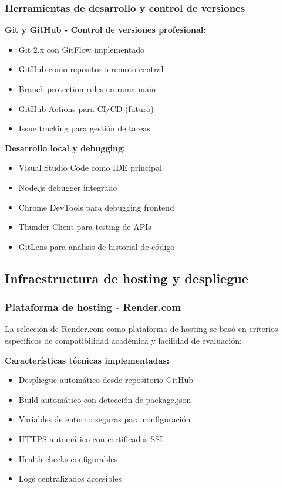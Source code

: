 \subsubsection{Herramientas de desarrollo y control de versiones}

\textbf{Git y GitHub - Control de versiones profesional:}
\begin{itemize}
    \item Git 2.x con GitFlow implementado
    \item GitHub como repositorio remoto central
    \item Branch protection rules en rama main
    \item GitHub Actions para CI/CD (futuro)
    \item Issue tracking para gestión de tareas
\end{itemize}

\textbf{Desarrollo local y debugging:}
\begin{itemize}
    \item Visual Studio Code como IDE principal
    \item Node.js debugger integrado
    \item Chrome DevTools para debugging frontend
    \item Thunder Client para testing de APIs
    \item GitLens para análisis de historial de código
\end{itemize}

\subsection{Infraestructura de hosting y despliegue}

\subsubsection{Plataforma de hosting - Render.com}

La selección de Render.com como plataforma de hosting se basó en criterios específicos de compatibilidad académica y facilidad de evaluación:

\textbf{Características técnicas implementadas:}
\begin{itemize}
    \item Despliegue automático desde repositorio GitHub
    \item Build automático con detección de package.json
    \item Variables de entorno seguras para configuración
    \item HTTPS automático con certificados SSL
    \item Health checks configurables
    \item Logs centralizados accesibles
\end{itemize}

